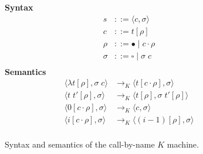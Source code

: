 \begin{figure}
\textbf{Syntax}
\begin{align*}
\tag{State} s &::= \langle c, \sigma \rangle \\
\tag{Closure} c &::= t [\rho] \\
\tag{Environment} \rho &::= \bullet \; | \; c \cdot \rho \\
\tag{Stack} \sigma &::= \square \; | \; \sigma \; c  \\
\end{align*}
\textbf{Semantics}
\begin{align*}
\tag{Lam}
\langle \lambda t[\rho], \sigma \; c \rangle 
  &\rightarrow_{K}
\langle t[c \cdot \rho], \sigma \rangle  \\
\tag{App}
\langle t \; t'[\rho], \sigma \rangle
  &\rightarrow_{K}
\langle t[\rho], \sigma \; t'[\rho] \rangle \\
\tag{Var1}
\langle 0[c \cdot \rho ], \sigma  \rangle
  &\rightarrow_{K}
\langle c, \sigma \rangle  \\
\tag{Var2}
\langle i[c \cdot \rho], \sigma \rangle
  &\rightarrow_{K}
\langle (i-1)[\rho], \sigma \rangle \\
\end{align*}
\caption{Syntax and semantics of the call-by-name $K$ machine.}
\label{fig:Krivine}
\end{figure}
